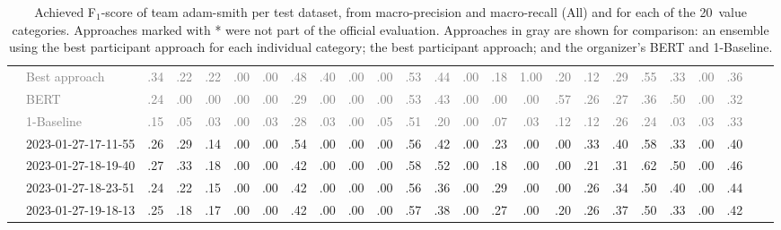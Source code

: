 \begin{table*}
\begin{tabular}{@{}ll@{\hspace{10pt}}c@{\hspace{5pt}}cccccccccccccccccccccc@{}}
& \textcolor{gray}{Best approach} & \textcolor{gray}{.34} & \textcolor{gray}{.22} & \textcolor{gray}{.22} & \textcolor{gray}{.00} & \textcolor{gray}{.00} & \textcolor{gray}{.48} & \textcolor{gray}{.40} & \textcolor{gray}{.00} & \textcolor{gray}{.00} & \textcolor{gray}{.53} & \textcolor{gray}{.44} & \textcolor{gray}{.00} & \textcolor{gray}{.18} & \textcolor{gray}{1.00} & \textcolor{gray}{.20} & \textcolor{gray}{.12} & \textcolor{gray}{.29} & \textcolor{gray}{.55} & \textcolor{gray}{.33} & \textcolor{gray}{.00} & \textcolor{gray}{.36} \\
& \textcolor{gray}{BERT} & \textcolor{gray}{.24} & \textcolor{gray}{.00} & \textcolor{gray}{.00} & \textcolor{gray}{.00} & \textcolor{gray}{.00} & \textcolor{gray}{.29} & \textcolor{gray}{.00} & \textcolor{gray}{.00} & \textcolor{gray}{.00} & \textcolor{gray}{.53} & \textcolor{gray}{.43} & \textcolor{gray}{.00} & \textcolor{gray}{.00} & \textcolor{gray}{.00} & \textcolor{gray}{.57} & \textcolor{gray}{.26} & \textcolor{gray}{.27} & \textcolor{gray}{.36} & \textcolor{gray}{.50} & \textcolor{gray}{.00} & \textcolor{gray}{.32} \\
& \textcolor{gray}{1-Baseline} & \textcolor{gray}{.15} & \textcolor{gray}{.05} & \textcolor{gray}{.03} & \textcolor{gray}{.00} & \textcolor{gray}{.03} & \textcolor{gray}{.28} & \textcolor{gray}{.03} & \textcolor{gray}{.00} & \textcolor{gray}{.05} & \textcolor{gray}{.51} & \textcolor{gray}{.20} & \textcolor{gray}{.00} & \textcolor{gray}{.07} & \textcolor{gray}{.03} & \textcolor{gray}{.12} & \textcolor{gray}{.12} & \textcolor{gray}{.26} & \textcolor{gray}{.24} & \textcolor{gray}{.03} & \textcolor{gray}{.03} & \textcolor{gray}{.33} \\
& 2023-01-27-17-11-55 & .26 & .29 & .14 & .00 & .00 & .54 & .00 & .00 & .00 & .56 & .42 & .00 & .23 & .00 & .00 & .33 & .40 & .58 & .33 & .00 & .40 \\
& 2023-01-27-18-19-40 & .27 & .33 & .18 & .00 & .00 & .42 & .00 & .00 & .00 & .58 & .52 & .00 & .18 & .00 & .00 & .21 & .31 & .62 & .50 & .00 & .46 \\
& 2023-01-27-18-23-51 & .24 & .22 & .15 & .00 & .00 & .42 & .00 & .00 & .00 & .56 & .36 & .00 & .29 & .00 & .00 & .26 & .34 & .50 & .40 & .00 & .44 \\
& 2023-01-27-19-18-13 & .25 & .18 & .17 & .00 & .00 & .42 & .00 & .00 & .00 & .57 & .38 & .00 & .27 & .00 & .20 & .26 & .37 & .50 & .33 & .00 & .42 \\
\bottomrule
\end{tabular}
\caption{Achieved F$_1$-score of team adam-smith per test dataset, from macro-precision and macro-recall (All) and for each of the 20~value categories. Approaches marked with * were not part of the official evaluation. Approaches in gray are shown for comparison: an ensemble using the best participant approach for each individual category; the best participant approach; and the organizer's BERT and 1-Baseline.}
\label{table-results}
\end{table*}
